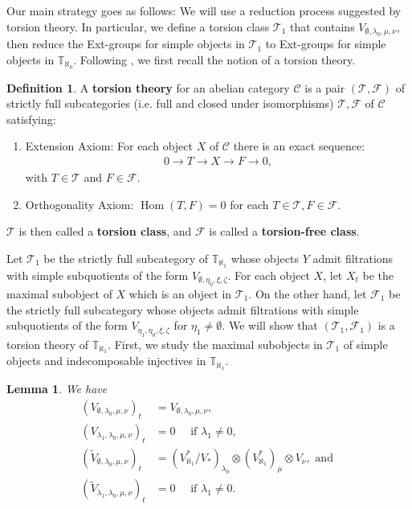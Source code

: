 \documentclass[openany, a4paper]{amsbook}
\newtheorem{lem}[thm]{Lemma}
\theoremstyle{definition}
\newtheorem{defn}[thm]{Definition}
\numberwithin{equation}{chapter}
\newcommand{\T}[1]{{\mathbb{T}}_{\aleph_{#1}}}
\DeclareMathOperator{\Hom}{\mathrm{Hom}}
\begin{document}
Our main strategy goes as follows: We will use a reduction process suggested by torsion theory. In particular, we define a torsion class $\mathcal{T}_1$ that contains $V_{\emptyset, \lambda_0, \mu, \nu}$, then reduce the Ext-groups for simple objects in $\mathcal{T}_1$ to Ext-groups for simple objects in $\T{0}$. Following \cite{dickson}, we first recall the notion of a torsion theory.

\begin{defn}\cite{dickson}\label{dickson 1}
    A \textbf{torsion theory} for an abelian category $\mathcal{C}$ is a pair $(\mathcal{T}, \mathcal{F})$ of strictly full subcategories (i.e. full and closed under isomorphisms) $\mathcal{T}, \mathcal{F}$ of $\mathcal{C}$ satisfying:
    \begin{enumerate}
        \item Extension Axiom: For each object $X$ of $\mathcal{C}$ there is an exact sequence:
        \begin{align*}
            0 \to T \to X \to F \to 0,
        \end{align*}
        with $T \in \mathcal{T}$ and $F \in \mathcal{F}$.
        \item Orthogonality Axiom: $\Hom(T, F) = 0$ for each $T \in \mathcal{T}, F \in \mathcal{F}$.
    \end{enumerate}

    $\mathcal{T}$ is then called a \textbf{torsion class}, and $\mathcal{F}$ is called a \textbf{torsion-free class}.
\end{defn}

Let $\mathcal{T}_1$ be the strictly full subcategory of $\T{1}$ whose objects $Y$ admit filtrations with simple subquotients of the form $V_{\emptyset, \eta_0, \xi, \zeta}$. For each object $X$, let $X_t$ be the maximal subobject of $X$ which is an object in $\mathcal{T}_1$. On the other hand, let $\mathcal{F}_1$ be the strictly full subcategory whose objects admit filtrations with simple subquotients of the form $V_{\eta_1, \eta_0, \xi, \zeta}$ for $\eta_1 \neq \emptyset$. We will show that $(\mathcal{T}_1, \mathcal{F}_1)$ is a torsion theory of $\T{1}$. First, we study the maximal subobjects in $\mathcal{T}_1$ of simple objects and indecomposable injectives in $\T{1}$. 

\begin{lem}\label{lemma 1 torsion 1}
    We have
    \begin{align}
        (V_{\emptyset, \lambda_0, \mu, \nu})_t &= V_{\emptyset, \lambda_0, \mu, \nu},\\
        (V_{\lambda_1, \lambda_0, \mu, \nu})_t &=  0 \quad \text{ if } \lambda_1 \neq 0,\\
        (\tilde{V}_{\emptyset, \lambda_0, \mu, \nu})_t &= (V^{\ast}_{\aleph_1}/V_{\ast})_{\lambda_0} \otimes (V^{\ast}_{\aleph_1})_\mu \otimes V_\nu, \text{ and } \\
        (\tilde{V}_{\lambda_1, \lambda_0, \mu, \nu})_t &= 0 \quad \text{ if } \lambda_1 \neq 0.
    \end{align}
\end{lem}
\end{document}
